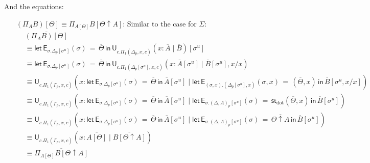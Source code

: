 \documentclass[10pt]{article}
\theoremstyle{definition}
\newcommand\U[3]{\ensuremath{\mathsf{U}_{#1}(#2 \mid #3)}}
\newcommand\StI[2]{\ensuremath{\mathsf{st}_{#1}(#2)}}
\newcommand\EEs[4]{\ensuremath{\mathsf{let} \, \mathsf{E}_{#1}(#3) \, = \, {#2} \, \mathsf{in} \, #4}}
\newcommand\unp[2]{\ensuremath{{#2}^u}}
\newcommand{\modeof}[1]{{#1}_p}
\newcommand{\sdot}{\ensuremath{\mathrm{dot}}}
\newcommand{\upstairs}[1]{\overline{#1}}
\begin{document}
And the equations:
\begin{enumerate}[style = multiline, labelwidth = 80pt]
\item[{$(\Pi_A B)[\Theta] \equiv \Pi_{A[\Theta]} B[\Theta \uparrow A]$}:] Similar to the case for $\Sigma$:
\begin{align*}
&\upstairs{(\Pi_A B)[\Theta]} \\
&\equiv \EEs{\sigma.\modeof{\Delta}[\unp{\Delta}{\sigma}]}{\upstairs{\Theta}}{\sigma}{\U{c. \Pi_1(\modeof{\Delta},x,c)}{x : \upstairs{A}}{\upstairs{B}}[\unp{\Delta}{\sigma}]} \\
&\equiv \EEs{\sigma.\modeof{\Delta}[\unp{\Delta}{\sigma}]}{\upstairs{\Theta}}{\sigma}{\U{c. \Pi_1(\modeof{\Delta}[\unp{\Delta}{\sigma}],x,c)}{x : \upstairs{A}[\unp{\Delta}{\sigma}]}{\upstairs{B}[\unp{\Delta}{\sigma}], x/x}} \\
&\equiv \U{c. \Pi_1(\modeof{\Gamma},x,c)}{x : \EEs{\sigma.\modeof{\Delta}[\unp{\Delta}{\sigma}]}{\upstairs{\Theta}}{\sigma}{\upstairs{A}[\unp{\Delta}{\sigma}]}}{\EEs{(\sigma, x). (\modeof{\Delta}[\unp{\Delta}{\sigma}], x)}{(\upstairs{\Theta}, x)}{\sigma, x}{\upstairs{B}[\unp{\Delta}{\sigma}, x/x]}} \\
&\equiv \U{c. \Pi_1(\modeof{\Gamma},x,c)}{x : \EEs{\sigma.\modeof{\Delta}[\unp{\Delta}{\sigma}]}{\upstairs{\Theta}}{\sigma}{\upstairs{A}[\unp{\Delta}{\sigma}]}}{\EEs{\sigma.\modeof{(\Delta,A)}[\unp{\Delta,A}{\sigma}]}{\StI{\sdot}{\upstairs{\Theta}, x}}{\sigma}{\upstairs{B}[\unp{\Delta, A}{\sigma}]}} \\
&\equiv \U{c. \Pi_1(\modeof{\Gamma},x,c)}{x : \EEs{\sigma.\modeof{\Delta}[\unp{\Delta}{\sigma}]}{\upstairs{\Theta}}{\sigma}{\upstairs{A}[\unp{\Delta}{\sigma}]}}{\EEs{\sigma.\modeof{(\Delta,A)}[\unp{\Delta,A}{\sigma}]}{\upstairs{\Theta \uparrow A}}{\sigma}{\upstairs{B}[\unp{\Delta, A}{\sigma}]}} \\
&\equiv \U{c. \Pi_1(\modeof{\Gamma},x,c)}{x : \upstairs{A[\Theta]}}{\upstairs{B[\Theta \uparrow A]}} \\
&\equiv \upstairs{\Pi_{A[\Theta]} B[\Theta \uparrow A]}
\end{align*}


\end{enumerate}
\end{document}
